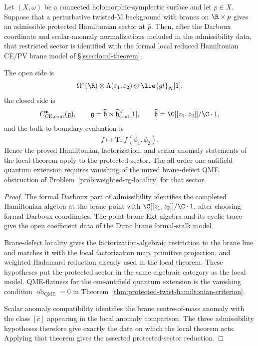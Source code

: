 \begin{prop}\label{prop:admissible-protected-sector-reduction}
  Let $(X,\omega)$ be a connected holomorphic-symplectic surface and
  let $p\in X$.  Suppose that a perturbative twisted-M background with
  branes on $\R\times p$ gives an admissible protected Hamiltonian
  sector at $\widehat p$.  Then, after the Darboux coordinate and
  scalar-anomaly normalizations included in the admissibility data, that
  restricted sector is identified with the formal local reduced Hamiltonian
  CE/PV brane model
  of \S\ref{ssec:local-theorem}.

  The open side is
  $$
  \Omega^*(\R)\otimes
  \Lambda(\varepsilon_1,\varepsilon_2)\otimes\lie{gl}_N[1],
  $$
  the closed side is
  $$
  C^\bullet_{\mathrm{CE,cont}}(\mathfrak g),
  \qquad
  \mathfrak g=
  \widehat{\mathfrak h}\ltimes
  \widehat{\mathfrak h}^{\vee}_{\mathrm{cont}}[1],
  \qquad
  \widehat{\mathfrak h}=\C[[z_1,z_2]]/\C\cdot 1,
  $$
  and the bulk-to-boundary evaluation is
  $$
  f\longmapsto
  \overline{\mathrm{Tr}\,f(\phi_1,\phi_2)}.
  $$
  Hence the proved Hamiltonian, factorization, and scalar-anomaly
  statements of the local theorem apply to the protected sector.  The
  all-order one-antifield quantum extension requires
  vanishing of the mixed brane-defect QME obstruction of
  Problem~\ref{prob:weighted-rg-locality} for that sector.
\end{prop}

\begin{proof}
  The formal Darboux part of admissibility identifies the completed
  Hamiltonian algebra at the brane point with
  $\C[[z_1,z_2]]/\C\cdot 1$, after choosing formal Darboux
  coordinates.  The point-brane Ext algebra and its cyclic trace give
  the open coefficient data of the Dirac brane formal-stalk model.

  Brane-defect locality gives the factorization-algebraic
  restriction to the brane line and matches it with the local
  factorization map, primitive projection, and weighted Hadamard
  reduction already used in the local theorem.  These
  hypotheses put the protected sector in the same algebraic category
  as the local model.  QME-flatness for the one-antifield quantum
  extension is the vanishing condition
  \(\operatorname{ob}_{\mathrm{QME}}=0\) in
  Theorem~\ref{thm:protected-twist-hamiltonian-criterion}.

  Scalar anomaly compatibility identifies the brane centre-of-mass
  anomaly with the class $[\bar c]$ appearing in the local anomaly
  comparison.  The three admissibility hypotheses therefore give exactly
  the data on which the local theorem acts.  Applying that theorem
  gives the asserted protected-sector reduction.
\end{proof}

